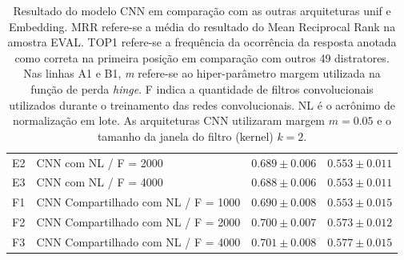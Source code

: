 \documentclass[sigconf]{acmart}
\begin{document}
\begin{table}[t]
\begin{tabular}{ p{1cm} p{6cm} >{\raggedleft\arraybackslash}p{4cm} >{\raggedleft\arraybackslash}p{4cm} }
 E2 & CNN com NL / F = 2000 & $0.689 \pm 0.006$ & $0.553 \pm 0.011$\\
 
 E3 & CNN com NL / F = 4000 & $0.688 \pm 0.006$ & $0.553 \pm 0.011$\\
 
 \hline
 
 F1 & CNN Compartilhado com NL / F = 1000 & $0.690 \pm 0.008$ & $0.553 \pm 0.015$\\
 
 F2 & CNN Compartilhado com NL / F = 2000 & $0.700 \pm 0.007$ & $0.573 \pm 0.012$\\
 
 F3 & CNN Compartilhado com NL / F = 4000 & $0.701 \pm 0.008$ & $0.577 \pm 0.015$\\
 
\hline
\end{tabular}
\caption{Resultado do modelo CNN em comparação com as outras arquiteturas unif e Embedding. MRR refere-se a média do resultado do Mean Reciprocal Rank na amostra EVAL. TOP1 refere-se a frequência da ocorrência da resposta anotada como correta na primeira posição em comparação com outros 49 distratores. Nas linhas A1 e B1, \emph{m} refere-se ao hiper-parâmetro margem utilizada na função de perda \emph{hinge}. F indica a quantidade de filtros convolucionais utilizados durante o treinamento das redes convolucionais. NL é o acrônimo de normalização em lote. As arquiteturas CNN utilizaram margem $m = 0.05$ e o tamanho da janela do filtro (kernel) $k = 2$.}
\label{table:resultados}
\end{table}
\end{document}
